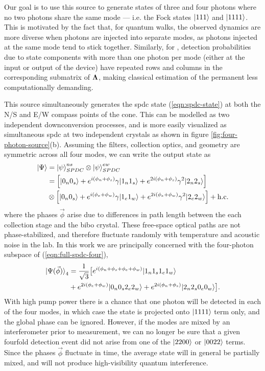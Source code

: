 Our goal is to use this source to generate states of three and four photons where no two photons share the same mode --- i.e. the Fock states $\mbox{$ | 111 \rangle $}$ and $\mbox{$ | 1111 \rangle $}$.
This is motivated by the fact that, for quantum walks, the observed dynamics are more diverse when photons are injected into separate modes, as photons injected at the same mode tend to stick together. Similarly, for \bosonsampling, detection probabilities due to state components with more than one photon per mode (either at the input or output of the device) have repeated rows and columns in the corresponding submatrix of $\mathbf{\Lambda}$, making classical estimation of the permanent less computationally demanding. 

This source simultaneously generates the \gls{spdc} state (\ref{eqn:spdc-state}) at both the N/S and E/W compass points of the cone.  This can be modelled as two independent downconversion processes, and is more easily visualized as simultaneous \gls{spdc} at two independent crystals as shown in figure \ref{fig:four-photon-source}(b).  Assuming the filters, collection optics, and geometry are symmetric across all four modes, we can write the output state as 
\begin{align}
   \mbox{$ | \Psi \rangle $} &= \mbox{$ | \psi \rangle $}_{SPDC}^{ns} \otimes \mbox{$ | \psi \rangle $}_{SPDC}^{ew}\\
              &= 
              \left[ \mbox{$ | 0_n0_s \rangle $} + 
              e^{i(\phi_n+\phi_s)}\gamma \mbox{$ | 1_n1_s \rangle $} + 
              e^{2i(\phi_n+\phi_s)}\gamma^2 \mbox{$ | 2_n2_s \rangle $} \right] \notag \\
              & \otimes 
              \left[ \mbox{$ | 0_n0_s \rangle $} + 
              e^{i(\phi_e+\phi_w)}\gamma \mbox{$ | 1_e1_w \rangle $} + 
              e^{2i(\phi_e+\phi_w)}\gamma^2 \mbox{$ | 2_e2_w \rangle $} \right] 
              + \text{h.c.}
              \label{eqn:full-spdc-four}
\end{align}
where the phases $\vec{\phi}$ arise due to differences in path length between the each collection stage and the \gls{bibo} crystal. These free-space optical paths are not phase-stabilized,  and therefore fluctuate randomly with temperature and acoustic noise in the lab.
In this work we are principally concerned with the four-photon subspace of (\ref{eqn:full-spdc-four}),
\begin{align}
    \mbox{$ | \Psi (\vec{\phi}) \rangle $}_4 &= 
    \frac{1}{\sqrt{3}}\bigl[
    e^{i(\phi_n+\phi_s+\phi_e+\phi_w)} \mbox{$ | 1_n1_s1_e1_w \rangle $} \notag \\
    &+ e^{2i(\phi_e+\phi_w)} \mbox{$ | 0_n0_s2_e2_w \rangle $}
    + e^{2i(\phi_n+\phi_s)} \mbox{$ | 2_n2_s0_e0_w \rangle $}
    \bigl].
\end{align}
With high pump power there is a chance that one photon will be detected in each of the four modes, in which case the state is projected onto $\mbox{$ | 1111 \rangle $}$ term only, and the global phase can be ignored. However, if the modes are mixed by an interferometer prior to measurement, we can no longer be sure that a given fourfold detection event did not arise from one of the $\mbox{$ | 2200 \rangle $}$ or $\mbox{$ | 0022 \rangle $}$ terms. Since the phases $\vec{\phi}$ fluctuate in time, the average state will in general be partially mixed, and will not produce high-visibility quantum interference.

